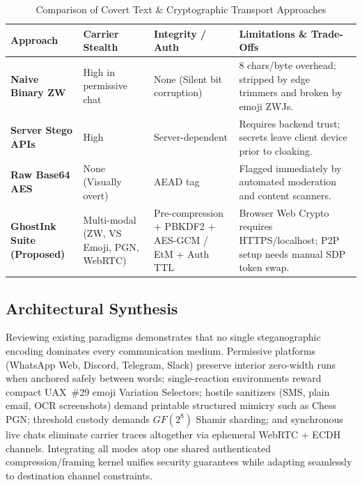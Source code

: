 \documentclass[12pt,a4paper,oneside,openany]{report}
\begin{document}
\begin{table}[H]
\centering
\small
\caption{Comparison of Covert Text \& Cryptographic Transport Approaches}
\label{tab:literature_comparison}
\begin{tabularx}{\textwidth}{p{3.2cm}p{2.6cm}p{3.0cm}X}
\toprule
\textbf{Approach} & \textbf{Carrier Stealth} & \textbf{Integrity / Auth} & \textbf{Limitations \& Trade-Offs} \\
\midrule
\textbf{Naive Binary ZW} & High in permissive chat & None (Silent bit corruption) & 8 chars/byte overhead; stripped by edge trimmers and broken by emoji ZWJs. \\
\textbf{Server Stego APIs} & High & Server-dependent & Requires backend trust; secrets leave client device prior to cloaking. \\
\textbf{Raw Base64 AES} & None (Visually overt) & AEAD tag & Flagged immediately by automated moderation and content scanners. \\
\textbf{GhostInk Suite (Proposed)} & Multi-modal (ZW, VS Emoji, PGN, WebRTC) & Pre-compression + PBKDF2 + AES-GCM / EtM + Auth TTL & Browser Web Crypto requires HTTPS/localhost; P2P setup needs manual SDP token swap. \\
\bottomrule
\end{tabularx}
\end{table}

\subsection{Architectural Synthesis}
Reviewing existing paradigms demonstrates that no single steganographic encoding dominates every communication medium. Permissive platforms (WhatsApp Web, Discord, Telegram, Slack) preserve interior zero-width runs when anchored safely between words; single-reaction environments reward compact UAX~\#29 emoji Variation Selectors; hostile sanitizers (SMS, plain email, OCR screenshots) demand printable structured mimicry such as Chess PGN; threshold custody demands $GF(2^8)$ Shamir sharding; and synchronous live chats eliminate carrier traces altogether via ephemeral WebRTC + ECDH channels. Integrating all modes atop one shared authenticated compression/framing kernel unifies security guarantees while adapting seamlessly to destination channel constraints.

\end{document}
